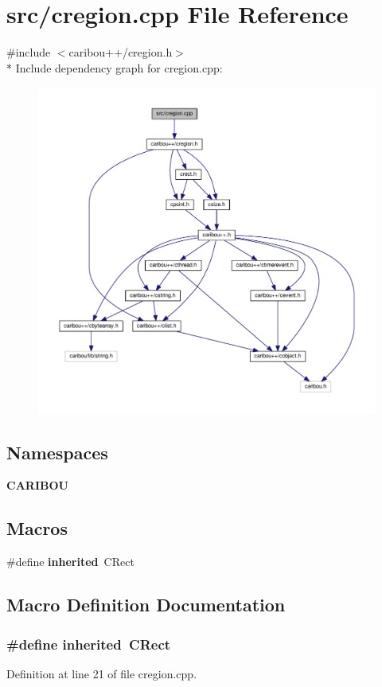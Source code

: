 \section{src/cregion.cpp File Reference}
\label{cregion_8cpp}
{\ttfamily \#include $<$caribou++/cregion.\-h$>$}\\*
Include dependency graph for cregion.\-cpp\-:\nopagebreak
\begin{figure}[H]
\begin{center}
\leavevmode
\includegraphics[width=350pt]{cregion_8cpp__incl}
\end{center}
\end{figure}
\subsection*{Namespaces}
\begin{DoxyCompactItemize}
\item 
{\bf C\-A\-R\-I\-B\-O\-U}
\end{DoxyCompactItemize}
\subsection*{Macros}
\begin{DoxyCompactItemize}
\item 
\#define {\bf inherited}~C\-Rect
\end{DoxyCompactItemize}


\subsection{Macro Definition Documentation}
\subsubsection[{inherited}]{\setlength{\rightskip}{0pt plus 5cm}\#define inherited~C\-Rect}\label{cregion_8cpp_a3920e3b7cb0909b941b2409493acf8f1}


Definition at line 21 of file cregion.\-cpp.

